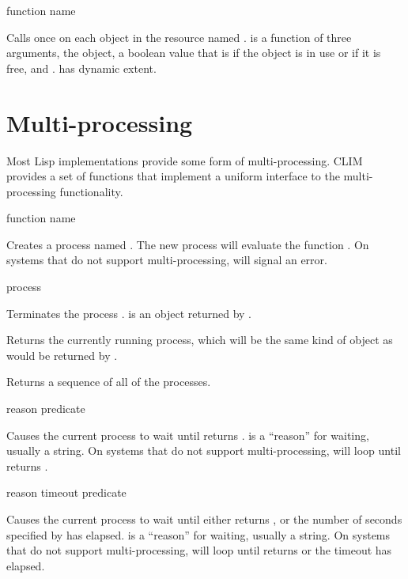  {function name}

Calls  once on each object in the resource named .
 is a function of three arguments, the object, a boolean value
that is  if the object is in use or  if it is free, and
.   has dynamic extent.


\section {Multi-processing}

Most Lisp implementations provide some form of multi-processing.  CLIM provides
a set of functions that implement a uniform interface to the multi-processing
functionality.

 {function \key name}

Creates a process named .  The new process will evaluate the function
.  On systems that do not support multi-processing,
 will signal an error.

 {process}

Terminates the process .   is an object returned by
.

 {}

Returns the currently running process, which will be the same kind of object as
would be returned by .

 {}

Returns a sequence of all of the processes.

 {reason predicate}

Causes the current process to wait until  returns .
 is a ``reason'' for waiting, usually a string.  On systems that do
not support multi-processing,  will loop until 
returns .

 {reason timeout predicate}

Causes the current process to wait until either  returns
, or the number of seconds specified by  has elapsed.
 is a ``reason'' for waiting, usually a string.  On systems that do
not support multi-processing,  will loop until
 returns  or the timeout has elapsed.

